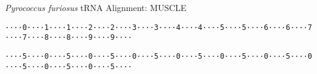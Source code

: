 \documentclass{article}
\newcommand{\digitbox}[1]{\colorbox{-}{\texttt{#1}}}
\begin{document}
\textit{Pyrococcus furiosus} tRNA Alignment: MUSCLE

\digitbox{·}\digitbox{·}\digitbox{·}\digitbox{·}\digitbox{0}\digitbox{·}\digitbox{·}\digitbox{·}\digitbox{·}\digitbox{1}\digitbox{·}\digitbox{·}\digitbox{·}\digitbox{·}\digitbox{1}\digitbox{·}\digitbox{·}\digitbox{·}\digitbox{·}\digitbox{2}\digitbox{·}\digitbox{·}\digitbox{·}\digitbox{·}\digitbox{2}\digitbox{·}\digitbox{·}\digitbox{·}\digitbox{·}\digitbox{3}\digitbox{·}\digitbox{·}\digitbox{·}\digitbox{·}\digitbox{3}\digitbox{·}\digitbox{·}\digitbox{·}\digitbox{·}\digitbox{4}\digitbox{·}\digitbox{·}\digitbox{·}\digitbox{·}\digitbox{4}\digitbox{·}\digitbox{·}\digitbox{·}\digitbox{·}\digitbox{5}\digitbox{·}\digitbox{·}\digitbox{·}\digitbox{·}\digitbox{5}\digitbox{·}\digitbox{·}\digitbox{·}\digitbox{·}\digitbox{6}\digitbox{·}\digitbox{·}\digitbox{·}\digitbox{·}\digitbox{6}\digitbox{·}\digitbox{·}\digitbox{·}\digitbox{·}\digitbox{7}\digitbox{·}\digitbox{·}\digitbox{·}\digitbox{·}\digitbox{7}\digitbox{·}\digitbox{·}\digitbox{·}\digitbox{·}\digitbox{8}\digitbox{·}\digitbox{·}\digitbox{·}\digitbox{·}\digitbox{8}\digitbox{·}\digitbox{·}\digitbox{·}\digitbox{·}\digitbox{9}\digitbox{·}\digitbox{·}\digitbox{·}\digitbox{·}\digitbox{9}\digitbox{·}\digitbox{·}\digitbox{·}\digitbox{·}

\vspace{-0.5mm}

\digitbox{·}\digitbox{·}\digitbox{·}\digitbox{·}\digitbox{5}\digitbox{·}\digitbox{·}\digitbox{·}\digitbox{·}\digitbox{0}\digitbox{·}\digitbox{·}\digitbox{·}\digitbox{·}\digitbox{5}\digitbox{·}\digitbox{·}\digitbox{·}\digitbox{·}\digitbox{0}\digitbox{·}\digitbox{·}\digitbox{·}\digitbox{·}\digitbox{5}\digitbox{·}\digitbox{·}\digitbox{·}\digitbox{·}\digitbox{0}\digitbox{·}\digitbox{·}\digitbox{·}\digitbox{·}\digitbox{5}\digitbox{·}\digitbox{·}\digitbox{·}\digitbox{·}\digitbox{0}\digitbox{·}\digitbox{·}\digitbox{·}\digitbox{·}\digitbox{5}\digitbox{·}\digitbox{·}\digitbox{·}\digitbox{·}\digitbox{0}\digitbox{·}\digitbox{·}\digitbox{·}\digitbox{·}\digitbox{5}\digitbox{·}\digitbox{·}\digitbox{·}\digitbox{·}\digitbox{0}\digitbox{·}\digitbox{·}\digitbox{·}\digitbox{·}\digitbox{5}\digitbox{·}\digitbox{·}\digitbox{·}\digitbox{·}\digitbox{0}\digitbox{·}\digitbox{·}\digitbox{·}\digitbox{·}\digitbox{5}\digitbox{·}\digitbox{·}\digitbox{·}\digitbox{·}\digitbox{0}\digitbox{·}\digitbox{·}\digitbox{·}\digitbox{·}\digitbox{5}\digitbox{·}\digitbox{·}\digitbox{·}\digitbox{·}\digitbox{0}\digitbox{·}\digitbox{·}\digitbox{·}\digitbox{·}\digitbox{5}\digitbox{·}\digitbox{·}\digitbox{·}\digitbox{·}
\end{document}
